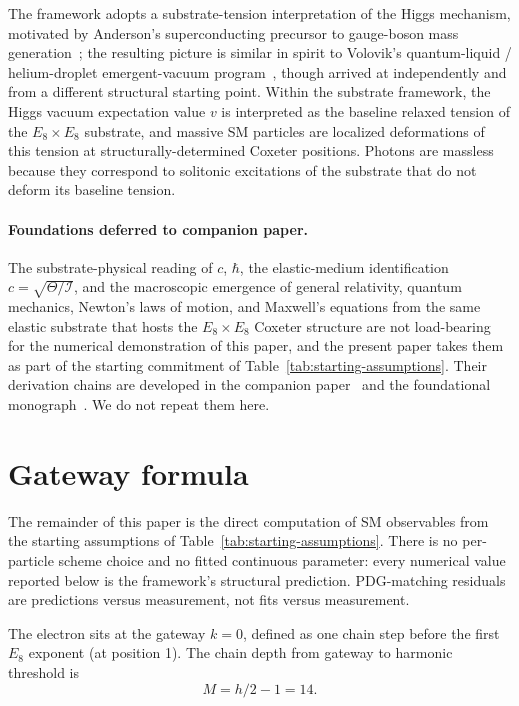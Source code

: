 ﻿\documentclass[reprint,amsmath,amssymb,aps,prd,longbibliography,floatfix]{revtex4-2}
\begin{document}
The framework adopts a substrate-tension interpretation of the Higgs
mechanism, motivated by Anderson's superconducting precursor to
gauge-boson mass generation~\cite{Anderson1962}; the resulting picture
is similar in spirit to Volovik's quantum-liquid / helium-droplet
emergent-vacuum program~\cite{Volovik2001,Volovik2003}, though arrived
at independently and from a different structural starting point. Within the substrate framework,
the Higgs vacuum expectation value $v$ is interpreted as the baseline
relaxed tension of the $E_8 \times E_8$ substrate, and massive SM
particles are localized deformations of this tension at
structurally-determined Coxeter positions. Photons are massless because
they correspond to solitonic excitations of the substrate that do not
deform its baseline tension.

\paragraph{Foundations deferred to companion paper.}
The substrate-physical reading of $c$, $\hbar$, the elastic-medium
identification $c = \sqrt{\Theta/\mathcal{I}}$, and the macroscopic
emergence of general relativity, quantum mechanics, Newton's laws of
motion, and Maxwell's equations from the same elastic substrate that
hosts the $E_8 \times E_8$ Coxeter structure are not load-bearing for
the numerical demonstration of this paper, and the present paper
takes them as part of the starting commitment of
Table~\ref{tab:starting-assumptions}. Their derivation chains are
developed in the companion paper~\cite{UnreasonableEffectiveness}
and the foundational monograph~\cite{ExistBook}. We do not repeat
them here.

\section{Gateway formula}
\label{sec:gateway}

The remainder of this paper is the direct computation of SM observables
from the starting assumptions of Table~\ref{tab:starting-assumptions}.
There is no per-particle scheme choice and no fitted continuous
parameter: every numerical value reported below is the framework's
structural prediction. PDG-matching residuals are predictions versus
measurement, not fits versus measurement.

The electron sits at the gateway $k=0$, defined as one chain step
before the first $E_8$ exponent (at position 1). The chain depth from
gateway to harmonic threshold is
\begin{equation}
M = h/2 - 1 = 14.
\end{equation}
\end{document}
